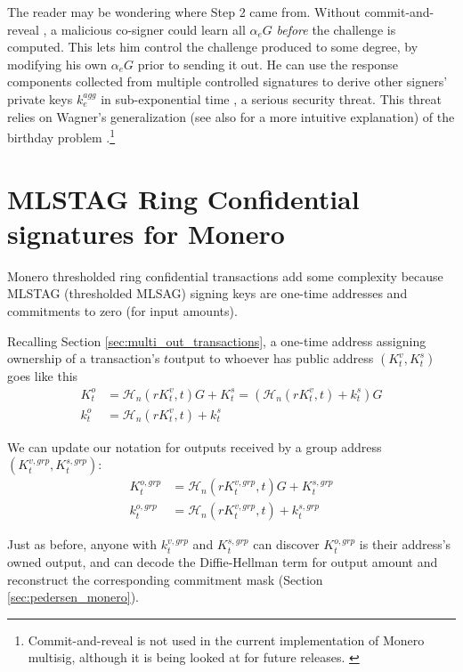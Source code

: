 The reader may be wondering where Step 2 came from. Without commit-and-reveal \cite{MRL-0009-multisig}, a malicious co-signer could learn all $\alpha_e G$ {\em before} the challenge is computed. This lets him control the challenge produced to some degree, by modifying his own $\alpha_e G$ prior to sending it out. He can use the response components collected from multiple controlled signatures to derive other signers' private keys $k^{agg}_e$ in sub-exponential time \cite{cryptoeprint:2018:417}, a serious security threat. This threat relies on Wagner's generalization \cite{generalized-birthday-wagner} (see also \cite{adam-wagnerian-tragedies} for a more intuitive explanation) of the birthday problem \cite{birthday-problem}.\footnote{Commit-and-reveal is not used in the current implementation of Monero multisig, although it is being looked at for future releases. \cite{multisig-research-issue-67}}



\section{MLSTAG Ring Confidential signatures for Monero}
\label{sec:MLSTAG-RingCT}

Monero thresholded ring confidential transactions add some complexity because MLSTAG (thresholded MLSAG) signing keys are one-time addresses and commitments to zero (for input amounts).

Recalling Section \ref{sec:multi_out_transactions}, a one-time address assigning ownership of a transaction's $t$\nth output to whoever has public address $(K^v_t,K^s_t)$ goes like this\vspace{.175cm}
\begin{align*}
  K_t^o &= \mathcal{H}_n(r K_t^v, t)G + K_t^s = (\mathcal{H}_n(r K_t^v, t) + k_t^s)G  \\
  k_t^o &= \mathcal{H}_n(r K_t^v, t) + k_t^s
\end{align*}

We can update our notation for outputs received by a group address $(K^{v,grp}_t,K^{s,grp}_t)$:\vspace{.175cm}
\begin{align*}
  K^{o,grp}_t &= \mathcal{H}_n(r K^{v,grp}_t, t)G + K^{s,grp}_t  \\
  k^{o,grp}_t &= \mathcal{H}_n(r K^{v,grp}_t, t) + k^{s,grp}_t
\end{align*}

Just as before, anyone with $k^{v,grp}_t$ and $K^{s,grp}_t$ can discover $K^{o,grp}_t$ is their address's owned output, and can decode the Diffie-Hellman term for output amount and reconstruct the corresponding commitment mask (Section \ref{sec:pedersen_monero}).

